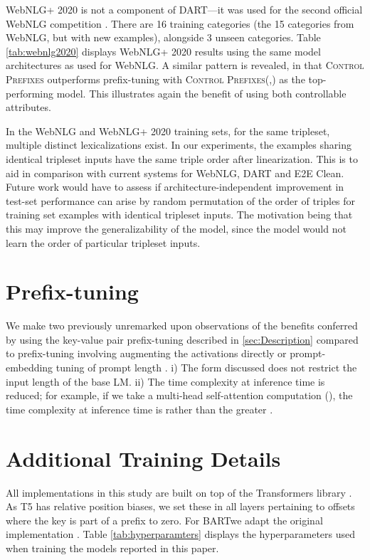 \documentclass[11pt]{article}
\newcommand{\control}{\textsc{Control Prefixes}\xspace}
\newcommand{\bartl}{BART}
\begin{document}
WebNLG+ 2020  is not a component of DART—it was used for the second
official WebNLG competition \citep{web2020}. There are 16 training categories
(the 15 categories from WebNLG, but with new examples), alongside 3 unseen
categories. Table \ref{tab:webnlg2020} displays WebNLG+ 2020 results using the same model architectures as used for WebNLG. A similar pattern is revealed, in that \control outperforms prefix-tuning with \control (,) as the top-performing model. This illustrates again the benefit of using both controllable attributes.

In the WebNLG and WebNLG+ 2020 training sets, for the same tripleset, multiple distinct lexicalizations exist. In our experiments, the examples sharing identical tripleset inputs have the same triple order after linearization. This is to aid in comparison with current systems for WebNLG, DART and E2E Clean. Future work would have to assess if architecture-independent improvement in test-set performance can arise by random permutation of the order of triples for training set examples with identical tripleset inputs. The motivation being that this may improve the generalizability of the model, since the model would not learn the order of particular tripleset inputs.



\FloatBarrier


\section{Prefix-tuning}
\label{app:prefix}
We make two previously unremarked upon observations of the benefits conferred by using the key-value pair prefix-tuning described in \cref{sec:Description} compared to prefix-tuning involving augmenting the activations directly \citep{lora} or prompt-embedding tuning of prompt length . i) The form discussed does not restrict the input length of the base LM. 
ii) The time complexity at inference time is reduced; for example, if we take a multi-head self-attention computation (), the time complexity at inference time is  rather than the greater .


\section{Additional Training Details}
\label{app:hyper}



All implementations in this study are built on top of the Transformers library \citep{wolf}. As T5 has relative position biases, we set these in all layers pertaining to offsets where the key is part of a prefix to zero. 
For \bartl we adapt the original implementation \citep{lisa}.
Table \ref{tab:hyperparamters} displays the hyperparameters used when training the models reported in this paper.
\end{document}
